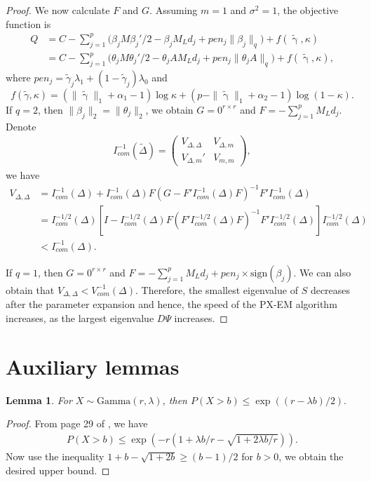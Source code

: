 \documentclass[pdftex, noinfoline, letter]{imsart}
\DeclareMathOperator*{\bgamma}{{\gamma}}
\theoremstyle{plain}
\newtheorem{lemma}[theorem]{Lemma}
\begin{document}
\begin{proof}
We now calculate $F$ and $G$. Assuming $m = 1$ and $\sigma^2 = 1$, the objective function is
\begin{align}
Q &= C - \sum_{j=1}^p \Big(\beta_j M \beta_j'/2 - \beta_j M_L d_j + pen_j  \|\beta_j\|_q \Big) + f(\widetilde{\bgamma}, \kappa)
\nonumber
\\
& = C - \sum_{j=1}^p \Big(\theta_j M \theta_j'/2 - \theta_j A M_L d_j + pen_j \|\theta_j A\|_q\Big) + f(\widetilde{\bgamma}, \kappa),
\end{align}
where $pen_j = \widetilde \gamma_j \lambda_1 + (1-\widetilde \gamma_j) \lambda_0$ and $$f(\widetilde\gamma, \kappa)
= (\|\widetilde{\bgamma}\|_1 + \alpha_1 - 1) \log \kappa + (p - \|\widetilde{\bgamma}\|_1+\alpha_2- 1) \log (1-\kappa).$$
If $q = 2$, then $\|\beta_j\|_2 = \|\theta_j\|_2$, we obtain $G = 0^{r\times r}$ and 
$F = -\sum_{j=1}^p M_L d_j$.
Denote
\begin{align*}
I^{-1}_{com}(\widetilde \Delta) 
=
\begin{pmatrix}
V_{\Delta, \Delta} & V_{\Delta, m}\\
V_{\Delta, m}' & V_{m,m}
\end{pmatrix},
\end{align*}
we have
\begin{align*}
V_{\Delta, \Delta} 
& = I_{com}^{-1}(\Delta) + I_{com}^{-1}(\Delta) F(G - F' I_{com}^{-1}(\Delta) F)^{-1} F'I_{com}^{-1}(\Delta) \\
& =  I_{com}^{-1/2}(\Delta) 
\left[
I - I_{com}^{-1/2}(\Delta) F
(F' I_{com}^{-1/2}(\Delta) F)^{-1} F' I_{com}^{-1/2}(\Delta)\right]
I_{com}^{-1/2}(\Delta)\\
& < I_{com}^{-1}(\Delta).
\end{align*}

If $q = 1$, then $G = 0^{r\times r}$ and $F = - \sum_{j=1}^p M_L d_j + pen_j \times \text{sign}(\beta_j)$.
We can also obtain that $V_{\Delta, \Delta} < V_{com}^{-1}(\Delta)$. 
Therefore, the smallest eigenvalue of $S$ decreases after the parameter expansion and hence, the speed of the PX-EM algorithm increases, as the largest eigenvalue $D\Psi$ increases. 
\end{proof}

\section{Auxiliary lemmas}
\label{sec:aux}

\begin{lemma}
\label{gammaUpperBound}
For $X \sim \text{Gamma}(r, \lambda)$, then $P(X> b) \leq \exp((r - \lambda b)/2).$
\end{lemma}
\begin{proof}
From page 29 of \citet{bouc13}, we have
\begin{align*}
    P(X > b) \leq 
    \exp\left(
        -r
        \left( 
            1 + \lambda b / r - \sqrt{1 + 2\lambda b / r}
        \right)
    \right).
\end{align*}
Now use the inequality $1 + b - \sqrt{1+2b} \geq (b-1)/2$ for $b > 0$, we obtain the desired upper bound.
\end{proof}
\end{document}
